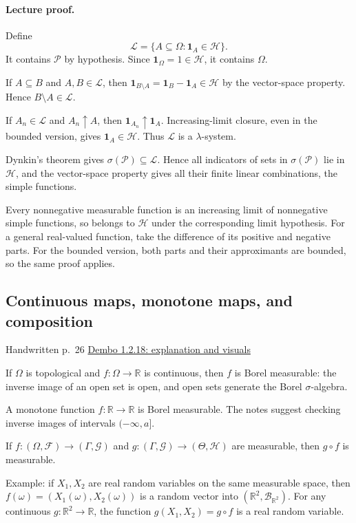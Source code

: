 \documentclass[11pt,letterpaper]{article}
\newcommand{\lecturesection}[1]{\subsection{#1}}
\begin{document}
\paragraph{Lecture proof.}
Define \[\mathcal L=\{A\subseteq\Omega:\mathbf1_A\in\mathcal H\}.\] It contains $\mathcal P$ by hypothesis. Since $\mathbf1_\Omega=1\in\mathcal H$, it contains $\Omega$.

If $A\subseteq B$ and $A,B\in\mathcal L$, then $\mathbf1_{B\setminus A}=\mathbf1_B-\mathbf1_A\in\mathcal H$ by the vector-space property. Hence $B\setminus A\in\mathcal L$.

If $A_n\in\mathcal L$ and $A_n\uparrow A$, then $\mathbf1_{A_n}\uparrow\mathbf1_A$. Increasing-limit closure, even in the bounded version, gives $\mathbf1_A\in\mathcal H$. Thus $\mathcal L$ is a $\lambda$-system.

Dynkin's theorem gives $\sigma(\mathcal P)\subseteq\mathcal L$. Hence all indicators of sets in $\sigma(\mathcal P)$ lie in $\mathcal H$, and the vector-space property gives all their finite linear combinations, the simple functions.

Every nonnegative measurable function is an increasing limit of nonnegative simple functions, so belongs to $\mathcal H$ under the corresponding limit hypothesis. For a general real-valued function, take the difference of its positive and negative parts. For the bounded version, both parts and their approximants are bounded, so the same proof applies.

\hypertarget{l3-s7}{}
\lecturesection{Continuous maps, monotone maps, and composition}
{\small\textcolor{lectureink}{Handwritten p.\ 26} \quad \href{https://josephrbailey.com/probability/\#entry-1-2-18}{Dembo 1.2.18: explanation and visuals}}

If $\Omega$ is topological and $f:\Omega\to\mathbb R$ is continuous, then $f$ is Borel measurable: the inverse image of an open set is open, and open sets generate the Borel $\sigma$-algebra.

A monotone function $f:\mathbb R\to\mathbb R$ is Borel measurable. The notes suggest checking inverse images of intervals $(-\infty,a]$.

If $f:(\Omega,\mathcal F)\to(\Gamma,\mathcal G)$ and $g:(\Gamma,\mathcal G)\to(\Theta,\mathcal H)$ are measurable, then $g\circ f$ is measurable.

Example: if $X_1,X_2$ are real random variables on the same measurable space, then $f(\omega)=(X_1(\omega),X_2(\omega))$ is a random vector into $(\mathbb R^2,\mathcal B_{\mathbb R^2})$. For any continuous $g:\mathbb R^2\to\mathbb R$, the function $g(X_1,X_2)=g\circ f$ is a real random variable.
\end{document}
